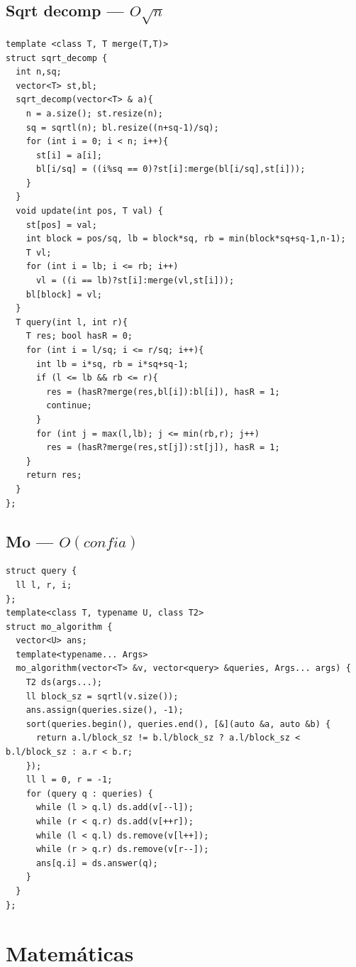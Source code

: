 \documentclass[10pt,a4paper,twocolumn]{article}
\begin{document}
    \subsection{Sqrt decomp --- $O\sqrt{n}$}
	\begin{lstlisting}[style=cpp, title={sqrt$\_$decomp.cpp}]
template <class T, T merge(T,T)>
struct sqrt_decomp {
  int n,sq;
  vector<T> st,bl;
  sqrt_decomp(vector<T> & a){
    n = a.size(); st.resize(n);
    sq = sqrtl(n); bl.resize((n+sq-1)/sq);
    for (int i = 0; i < n; i++){
      st[i] = a[i];
      bl[i/sq] = ((i%sq == 0)?st[i]:merge(bl[i/sq],st[i]));
    }
  }
  void update(int pos, T val) {
    st[pos] = val;
    int block = pos/sq, lb = block*sq, rb = min(block*sq+sq-1,n-1);
    T vl;
    for (int i = lb; i <= rb; i++)
      vl = ((i == lb)?st[i]:merge(vl,st[i]));
    bl[block] = vl;
  }
  T query(int l, int r){
    T res; bool hasR = 0;
    for (int i = l/sq; i <= r/sq; i++){
      int lb = i*sq, rb = i*sq+sq-1;
      if (l <= lb && rb <= r){
        res = (hasR?merge(res,bl[i]):bl[i]), hasR = 1;
        continue;
      }
      for (int j = max(l,lb); j <= min(rb,r); j++)
        res = (hasR?merge(res,st[j]):st[j]), hasR = 1;
    }
    return res;
  }
};
    \end{lstlisting}

    \subsection{Mo --- $O(confia)$}
	\begin{lstlisting}[style=cpp, title={mo.cpp}]
struct query {
  ll l, r, i;
};
template<class T, typename U, class T2>
struct mo_algorithm {
  vector<U> ans;
  template<typename... Args>
  mo_algorithm(vector<T> &v, vector<query> &queries, Args... args) {
    T2 ds(args...);
    ll block_sz = sqrtl(v.size());
    ans.assign(queries.size(), -1);
    sort(queries.begin(), queries.end(), [&](auto &a, auto &b) {
      return a.l/block_sz != b.l/block_sz ? a.l/block_sz < b.l/block_sz : a.r < b.r;
    });
    ll l = 0, r = -1;
    for (query q : queries) {
      while (l > q.l) ds.add(v[--l]);
      while (r < q.r) ds.add(v[++r]);
      while (l < q.l) ds.remove(v[l++]);
      while (r > q.r) ds.remove(v[r--]);
      ans[q.i] = ds.answer(q);
    }
  }
};
    \end{lstlisting}
	\section{Matem\'aticas}
	
\end{document}

